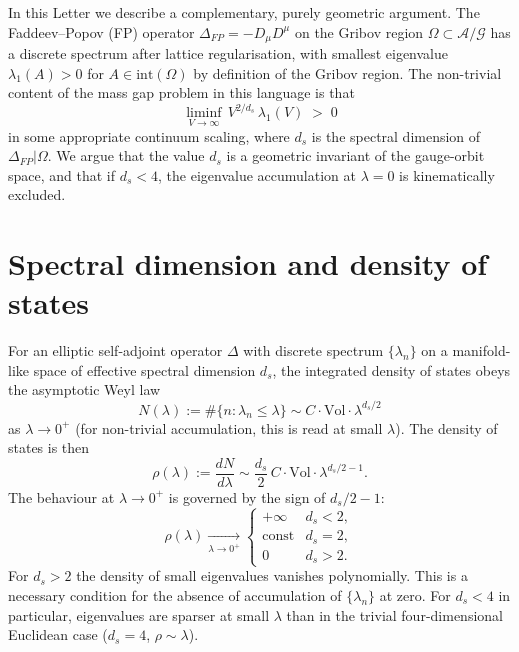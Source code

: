 \documentclass[aps,prl,reprint,nofootinbib,superscriptaddress,floatfix]{revtex4-2}
\begin{document}
In this Letter we describe a complementary, purely geometric argument. The Faddeev--Popov (FP) operator $\Delta_{FP} = -D_\mu D^\mu$ on the Gribov region $\Omega \subset \mathcal{A}/\mathcal{G}$ has a discrete spectrum after lattice regularisation, with smallest eigenvalue $\lambda_1(A) > 0$ for $A \in \mathrm{int}(\Omega)$ by definition of the Gribov region. The non-trivial content of the mass gap problem in this language is that
\begin{equation}
\liminf_{V \to \infty} \, V^{2/d_s} \, \lambda_1(V) \; > \; 0
\label{eq:gap}
\end{equation}
in some appropriate continuum scaling, where $d_s$ is the spectral dimension of $\Delta_{FP}|\Omega$. We argue that the value $d_s$ is a geometric invariant of the gauge-orbit space, and that if $d_s < 4$, the eigenvalue accumulation at $\lambda = 0$ is kinematically excluded.

\section{Spectral dimension and density of states}

For an elliptic self-adjoint operator $\Delta$ with discrete spectrum $\{\lambda_n\}$ on a manifold-like space of effective spectral dimension $d_s$, the integrated density of states obeys the asymptotic Weyl law
\begin{equation}
N(\lambda) := \#\{n : \lambda_n \leq \lambda\} \sim C \cdot \mathrm{Vol} \cdot \lambda^{d_s/2}
\end{equation}
as $\lambda \to 0^+$ (for non-trivial accumulation, this is read at small $\lambda$). The density of states is then
\begin{equation}
\rho(\lambda) := \frac{dN}{d\lambda} \sim \frac{d_s}{2} \, C \cdot \mathrm{Vol} \cdot \lambda^{d_s/2 - 1}.
\end{equation}
The behaviour at $\lambda \to 0^+$ is governed by the sign of $d_s/2 - 1$:
\begin{equation}
\rho(\lambda) \xrightarrow[\lambda \to 0^+]{}
\begin{cases}
+\infty & d_s < 2, \\
\text{const} & d_s = 2, \\
0 & d_s > 2.
\end{cases}
\end{equation}
For $d_s > 2$ the density of small eigenvalues vanishes polynomially. This is a necessary condition for the absence of accumulation of $\{\lambda_n\}$ at zero. For $d_s < 4$ in particular, eigenvalues are sparser at small $\lambda$ than in the trivial four-dimensional Euclidean case ($d_s = 4$, $\rho \sim \lambda$).
\end{document}
